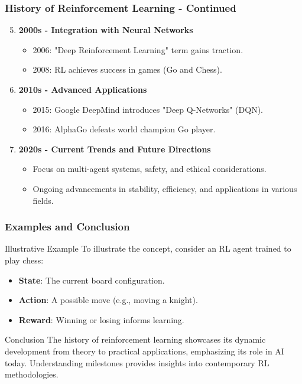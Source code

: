 \documentclass[aspectratio=169]{beamer}
\begin{document}
\begin{frame}[fragile]
    \frametitle{History of Reinforcement Learning - Continued}
    \begin{enumerate}
        \setcounter{enumi}{4}
        \item \textbf{2000s - Integration with Neural Networks}
        \begin{itemize}
            \item 2006: "Deep Reinforcement Learning" term gains traction.
            \item 2008: RL achieves success in games (Go and Chess).
        \end{itemize}

        \item \textbf{2010s - Advanced Applications}
        \begin{itemize}
            \item 2015: Google DeepMind introduces "Deep Q-Networks" (DQN).
            \item 2016: AlphaGo defeats world champion Go player.
        \end{itemize}

        \item \textbf{2020s - Current Trends and Future Directions}
        \begin{itemize}
            \item Focus on multi-agent systems, safety, and ethical considerations.
            \item Ongoing advancements in stability, efficiency, and applications in various fields.
        \end{itemize}
    \end{enumerate}
\end{frame}

\begin{frame}[fragile]
    \frametitle{Examples and Conclusion}
    \begin{block}{Illustrative Example}
        To illustrate the concept, consider an RL agent trained to play chess:
        \begin{itemize}
            \item \textbf{State}: The current board configuration.
            \item \textbf{Action}: A possible move (e.g., moving a knight).
            \item \textbf{Reward}: Winning or losing informs learning.
        \end{itemize}
    \end{block}

    \begin{block}{Conclusion}
        The history of reinforcement learning showcases its dynamic development from theory to practical applications, emphasizing its role in AI today. Understanding milestones provides insights into contemporary RL methodologies.
    \end{block}
\end{frame}
\end{document}
